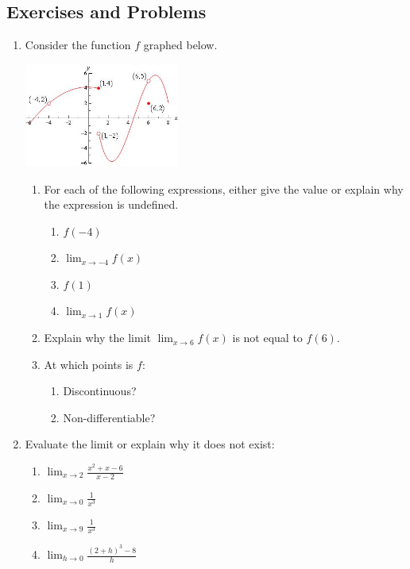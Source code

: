\subsection{Exercises and Problems}
\begin{enumerate}
  \item Consider the function $ f $ graphed below.
    \begin{center}
      \includegraphics[width=0.4\textwidth]{oslimit}
    \end{center}
    \begin{enumerate}
      \item For each of the following expressions, either give the value or explain why the expression is undefined.
        \begin{enumerate}
          \item $ f(-4) $
          \item $ \lim_{x \to -4} f(x) $
          \item $ f(1) $
          \item $ \lim_{x \to 1} f(x) $
        \end{enumerate}
      \item Explain why the limit $ \lim_{x \to 6} f(x) $ is not equal to $ f(6) $.
      \item At which points is $ f $:
        \begin{enumerate}
          \item Discontinuous?
          \item Non-differentiable?
        \end{enumerate}
    \end{enumerate}
  \item Evaluate the limit or explain why it does not exist:
    \begin{multicols}{2}
    \begin{enumerate}
      \item $ \lim_{x \to 2} \frac{x^2 + x - 6}{x - 2} $
      \item $ \lim_{x \to 0} \frac{1}{x^3} $
      \item $ \lim_{x \to 9} \frac{1}{x^3} $
      \item $ \lim_{h \to 0} \frac{(2 + h)^3 - 8}{h} $

\end{enumerate}
\end{multicols}
\end{enumerate}

